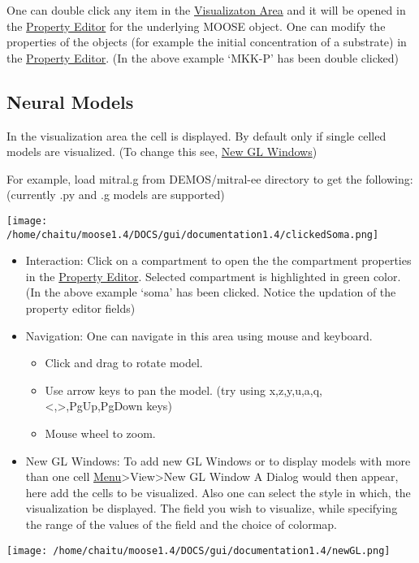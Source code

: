 \documentclass[11pt]{article}
\begin{document}
   One can double click any item in the \hyperref[sec-2]{Visualizaton Area} and it  will be opened in the \hyperref[sec-2]{Property Editor} for the underlying MOOSE object. One can modify the properties of the objects (for example the initial concentration of a substrate) in the \hyperref[sec-2]{Property Editor}. (In the above example `MKK-P' has been double clicked)

   
\subsection{Neural Models}
\label{sec-3.2}

    In the visualization area the cell is displayed. By default only if single celled models are visualized. (To change this see, \hyperref[sec-3.2]{New GL Windows})
    
    For example, load mitral.g from DEMOS/mitral-ee directory to get the following:  (currently .py and .g models are supported) 

  \texttt{[image: /home/chaitu/moose1.4/DOCS/gui/documentation1.4/clickedSoma.png]}
    
\begin{itemize}
\item Interaction: 
      Click on a compartment to open the the compartment properties in the \hyperref[sec-2]{Property Editor}. Selected compartment is highlighted in green color. (In the above example `soma' has been clicked. Notice the updation of the property editor fields)
\item Navigation:
      One can navigate in this area using mouse and keyboard.

\begin{itemize}
\item Click and drag to rotate model.
\item Use arrow keys to pan the model. (try using x,z,y,u,a,q,<,>,PgUp,PgDown keys)
\item Mouse wheel to zoom.
\end{itemize}

\end{itemize}
    
\begin{itemize}
\item New GL Windows:
      To add new GL Windows or to display models with more than one cell \hyperref[sec-2]{Menu}>View>New GL Window  A Dialog would then appear, here add the cells to be visualized. Also one can select the style in which, the visualization be displayed. The field you wish to visualize, while specifying the range of the values of the field and the choice of colormap.
\end{itemize}
  \texttt{[image: /home/chaitu/moose1.4/DOCS/gui/documentation1.4/newGL.png]}
\end{document}
